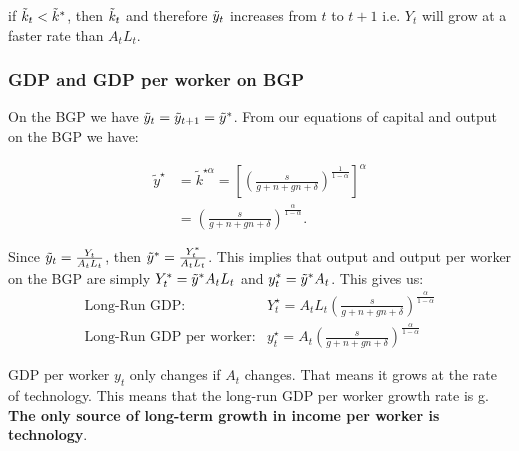 \documentclass[11pt]{article}
\begin{document}
\begin{shaded}
    if $\Tilde{k}_t<\Tilde{k}^*$, then $\Tilde{k}_t$ and therefore $\Tilde{y}_t$ increases from $t$ to $t+1$ i.e. $Y_t$ will grow at a faster rate than $A_tL_t$.
\end{shaded}

\subsubsection{GDP and GDP per worker on BGP}

On the BGP we have $\Tilde{y}_t = \Tilde{y}_{t+1} = \Tilde{y}^*$. From our equations of capital and output on the BGP we have:

\begin{equation}
\begin{aligned}
\tilde{y}^{\star} & =\tilde{k}^{\star \alpha}=\left[\left(\frac{s}{g+n+g n+\delta}\right)^{\frac{1}{1-\alpha}}\right]^\alpha \\
& =\left(\frac{s}{g+n+g n+\delta}\right)^{\frac{\alpha}{1-\alpha}} .
\end{aligned}
\end{equation}

\begin{note}
    Since $\Tilde{y}_t = \frac{Y_t}{A_tL_t}$, then $\Tilde{y}^* = \frac{Y_t^*}{A_tL_t}$. This implies that output and output per worker on the BGP are simply $Y_t^* = \Tilde{y}^* A_tL_t$ and $y_t^* = \Tilde{y}^* A_t$. This gives us:
    \begin{align}
        \text{Long-Run GDP:} & Y_t^{\star}=A_t L_t\left(\frac{s}{g+n+g n+\delta}\right)^{\frac{\alpha}{1-\alpha}} \\
        \text{Long-Run GDP per worker:} & y_t^{\star}=A_t\left(\frac{s}{g+n+g n+\delta}\right)^{\frac{\alpha}{1-\alpha}}
    \end{align}
\end{note}

GDP per worker $y_t$ only changes if $A_t$ changes. That means it grows at the rate of technology. This means that the long-run GDP per worker growth rate is g. \textbf{The only source of long-term growth in income per worker is technology}.
\end{document}
